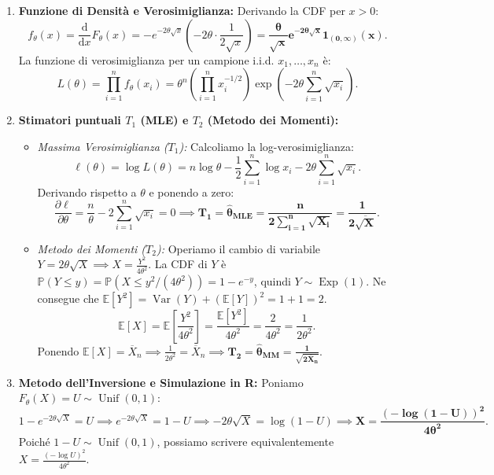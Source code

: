 \documentclass[11pt,a4paper]{article}
\newcommand{\EE}{\mathbb{E}}
\newcommand{\Prob}{\mathbb{P}}
\newcommand{\Var}{\operatorname{Var}}
\newcommand{\dx}{\mathrm{d}x}
\begin{document}
\begin{soluzionebox}
\begin{enumerate}[label=(\roman*)]
    \item \textbf{Funzione di Densità e Verosimiglianza:}
    Derivando la CDF per $x > 0$:
    \[
    f_\theta(x) = \frac{\mathrm{d}}{\dx} F_\theta(x) = -e^{-2\theta\sqrt{x}} \left( -2\theta \cdot \frac{1}{2\sqrt{x}} \right) = \mathbf{\frac{\theta}{\sqrt{x}} e^{-2\theta\sqrt{x}} \mathbf{1}_{(0, \infty)}(x)}.
    \]
    La funzione di verosimiglianza per un campione i.i.d. $x_1, \dots, x_n$ è:
    \[
    L(\theta) = \prod_{i=1}^n f_\theta(x_i) = \theta^n \left( \prod_{i=1}^n x_i^{-1/2} \right) \exp\left( -2\theta \sum_{i=1}^n \sqrt{x_i} \right).
    \]

    \item \textbf{Stimatori puntuali $T_1$ (MLE) e $T_2$ (Metodo dei Momenti):}
    \begin{itemize}
        \item \emph{Massima Verosimiglianza ($T_1$):}
        Calcoliamo la log-verosimiglianza:
        \[
        \ell(\theta) = \log L(\theta) = n \log \theta - \frac{1}{2}\sum_{i=1}^n \log x_i - 2\theta \sum_{i=1}^n \sqrt{x_i}.
        \]
        Derivando rispetto a $\theta$ e ponendo a zero:
        \[
        \frac{\partial \ell}{\partial \theta} = \frac{n}{\theta} - 2\sum_{i=1}^n \sqrt{x_i} = 0 \implies \bm{T_1 = \widehat{\theta}_{\text{MLE}} = \frac{n}{2\sum_{i=1}^n \sqrt{X_i}} = \frac{1}{2 \overline{\sqrt{X}}}}.
        \]
        \item \emph{Metodo dei Momenti ($T_2$):}
        Operiamo il cambio di variabile $Y = 2\theta\sqrt{X} \implies X = \frac{Y^2}{4\theta^2}$.
        La CDF di $Y$ è $\Prob(Y \le y) = \Prob(X \le y^2/(4\theta^2)) = 1 - e^{-y}$, quindi $Y \sim \operatorname{Exp}(1)$.
        Ne consegue che $\EE[Y^2] = \Var(Y) + (\EE[Y])^2 = 1 + 1 = 2$.
        \[
        \EE[X] = \EE\left[ \frac{Y^2}{4\theta^2} \right] = \frac{\EE[Y^2]}{4\theta^2} = \frac{2}{4\theta^2} = \frac{1}{2\theta^2}.
        \]
        Ponendo $\EE[X] = \overline{X}_n \implies \frac{1}{2\theta^2} = \overline{X}_n \implies \bm{T_2 = \widehat{\theta}_{\text{MM}} = \frac{1}{\sqrt{2\overline{X}_n}}}$.
    \end{itemize}

    \item \textbf{Metodo dell'Inversione e Simulazione in R:}
    Poniamo $F_\theta(X) = U \sim \operatorname{Unif}(0, 1)$:
    \[
    1 - e^{-2\theta\sqrt{X}} = U \implies e^{-2\theta\sqrt{X}} = 1 - U \implies -2\theta\sqrt{X} = \log(1-U) \implies \bm{X = \frac{(-\log(1-U))^2}{4\theta^2}}.
    \]
    Poiché $1-U \sim \operatorname{Unif}(0,1)$, possiamo scrivere equivalentemente $X = \frac{(-\log U)^2}{4\theta^2}$.
\end{enumerate}


\end{soluzionebox}
\end{document}
